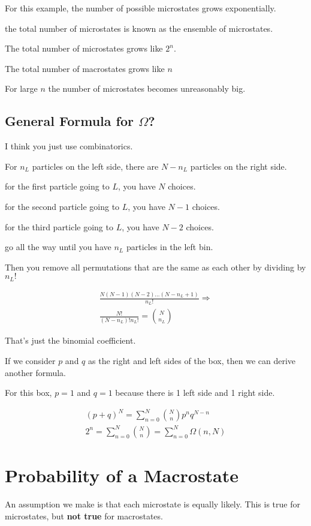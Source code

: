 \documentclass[fleqn]{report}
\newcommand{\equations} [1] {
\begin{gather*}
#1
\end{gather*}
}
\begin{document}
For this example, the number of possible microstates grows 
exponentially. 

the total number of microstates is known as the ensemble of microstates.

The total number of microstates grows like $2^n$.

The total number of macrostates grows like $n$

For large $n$ the number of microstates becomes unreasonably big.

\subsection{General Formula for $\Omega$?}
I think you just use combinatorics.

For $n_L$ particles on the left side, there are $N - n_L$ particles on the 
right side. 

for the first particle going to $L$, you have $N$ choices.

for the second particle going to $L$, you have $N - 1$ choices.

for the third particle going to $L$, you have $N - 2$ choices.

go all the way until you have $n_L$ particles in the left bin. 

Then you remove all permutations that are the same as each other by 
dividing by $n_L!$

\equations{
    \frac{N(N-1)(N-2) \ldots (N - n_L + 1)}{n_L!}
    \Rightarrow 
    \\
    \frac{N!}{(N - n_L)! n_L!}
    =
    {N \choose n_L}
}

That's just the binomial coefficient.

If we consider $p$ and $q$ as the right and left sides 
of the box, then we can derive another formula.

For this box, $p = 1$ and $q = 1$ because there is 1 left side and 1 right side.
\equations{
    (p + q)^N 
    =
    \sum^N_{n = 0}
    {N \choose n}
    p^n q^{N - n}
    \\
    2^n 
    =
    \sum^N_{n = 0}
    {N \choose n}
    =
    \sum^N_{n = 0}
    \Omega(n, N)
}

\section{Probability of a Macrostate}

An assumption we make is that each microstate is equally likely. 
This is true for microstates, but \textbf{not true} for macrostates.
\end{document}
